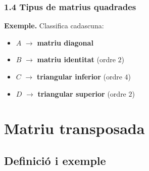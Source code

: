\documentclass[aspectratio=169]{beamer}
\begin{document}
\begin{frame}[t]
  \frametitle{1.4 Tipus de matrius quadrades}

  \vspace{-0.28cm}
  \centering
  {\small
  \textbf{Exemple.} Classifica cadascuna:
  \vspace{0.06cm}
  \begin{itemize}
    \item<2-> $A$ $\rightarrow$ \textcolor{margueVerdFosc}{\textbf{matriu diagonal}}
    \item<3-> $B$ $\rightarrow$ \textcolor{margueVerdFosc}{\textbf{matriu identitat}} \;(ordre $2$)
    \item<4-> $C$ $\rightarrow$ \textcolor{margueVerdFosc}{\textbf{triangular inferior}} \;(ordre $4$)
    \item<5-> $D$ $\rightarrow$ \textcolor{margueVerdFosc}{\textbf{triangular superior}} \;(ordre $2$)
  \end{itemize}
  }
\end{frame}

\section{Matriu transposada}
\subsection{Definició i exemple}
\end{document}
